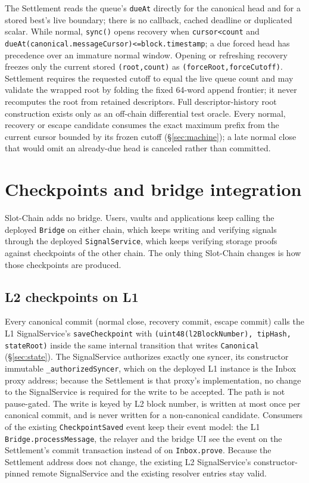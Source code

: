 \documentclass[a4paper,11pt]{article}
\newcommand{\code}[1]{\nolinkurl{#1}}
\begin{document}
The Settlement reads the queue's \code{dueAt} directly for the canonical
head and for a stored best's live boundary; there is no callback, cached
deadline or duplicated scalar.  While normal, \code{sync()} opens recovery
when \code{cursor<count} and
\code{dueAt(canonical.messageCursor)<=block.timestamp}; a due forced head has
precedence over an immature normal window.  Opening or refreshing recovery
freezes only the current stored \code{(root,count)} as
\code{(forceRoot,forceCutoff)}.  Settlement requires the requested cutoff to
equal the live queue count and may validate the wrapped root by folding the
fixed 64-word append frontier; it never recomputes the root from retained
descriptors.  Full descriptor-history root construction exists only as an
off-chain differential test oracle.  Every normal, recovery or escape
candidate consumes the exact maximum prefix from the current cursor bounded
by its frozen cutoff (\S\ref{sec:machine}); a late normal close that would
omit an already-due head is canceled rather than committed.
\section{Checkpoints and bridge integration}\label{sec:bridge}

Slot-Chain adds no bridge.  Users, vaults and applications keep calling the
deployed \code{Bridge} on either chain, which keeps writing and verifying
signals through the deployed \code{SignalService}, which keeps verifying
storage proofs against checkpoints of the other chain.  The only thing
Slot-Chain changes is how those checkpoints are produced.

\subsection{L2 checkpoints on L1}

Every canonical commit (normal close, recovery commit, escape commit) calls
the L1 SignalService's \code{saveCheckpoint} with
\code{(uint48(l2BlockNumber), tipHash, stateRoot)} inside the same internal
transition that writes \code{Canonical} (\S\ref{sec:state}).  The SignalService
authorizes exactly one syncer, its constructor immutable
\code{_authorizedSyncer}, which on the deployed L1 instance is the Inbox proxy
address; because the Settlement is that proxy's implementation, no change to
the SignalService is required for the write to be accepted.  The path is not
pause-gated.  The write is keyed by L2 block number, is written at most once
per canonical commit, and is never written for a non-canonical candidate.
Consumers of the existing \code{CheckpointSaved} event keep their event model:
the L1 \code{Bridge.processMessage}, the relayer and the bridge UI see the
event on the Settlement's commit transaction instead of on \code{Inbox.prove}.
Because the Settlement address does not change, the existing L2 SignalService's
constructor-pinned remote SignalService and the existing resolver entries stay
valid.
\end{document}
